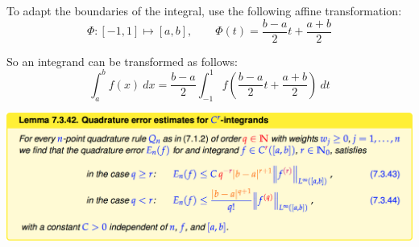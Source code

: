 \documentclass[12pt, a4paper]{article}
\begin{document}
To adapt the boundaries of the integral, use the following affine transformation:
\begin{equation*}
	\Phi: [-1, 1] \mapsto [a, b], \qquad \Phi(t) = \frac{b-a}{2}t + \frac{a+b}{2}
\end{equation*}

So an integrand can be transformed as follows:
\begin{equation*}
	\int_a^b f(x)\ dx = \frac{b-a}{2}\int_{-1}^1 f(\frac{b-a}{2}t + \frac{a+b}{2})\ dt
\end{equation*}

\begin{center}
	\includegraphics[width=380pt]{quadrature_error}
\end{center}
\end{document}

